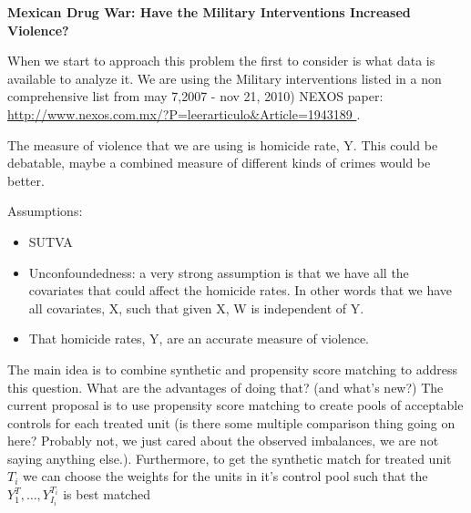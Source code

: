 \documentclass{article}[11 pt]
\begin{document}
\begin{center}	
	\textbf{Mexican Drug War: Have the Military Interventions Increased Violence?}
\end{center}

When we start to approach this problem the first to consider is what data is available to analyze it. We are using the Military interventions listed in a non comprehensive list from may 7,2007 - nov 21, 2010) NEXOS paper: \url{http://www.nexos.com.mx/?P=leerarticulo&Article=1943189 }. %

The measure of violence that we are using is homicide rate, Y. This could be debatable, maybe a combined measure of different kinds of crimes would be better.

Assumptions:
\begin{itemize}
	\item SUTVA
	\item Unconfoundedness: a very strong assumption is that we have all the covariates that could affect the homicide rates. In other words that we have all covariates, X, such that given X,  W is independent of Y.
	\item That homicide rates, Y, are an accurate measure of violence. 
\end{itemize}

The main idea is to combine synthetic and propensity score matching to address this question. What are the advantages of doing that? (and what's new?)
The current proposal is to use propensity score matching to create pools of acceptable controls for each treated unit (is there some multiple comparison thing going on here? Probably not, we just cared about the observed imbalances, we are not saying anything else.). Furthermore, to get the synthetic match for treated unit $T_i$ we can choose the weights for the units in it's control pool such that the $Y_1^T,\ldots, Y_{I_i}^{T_i}$ is best matched
	
\end{document}
